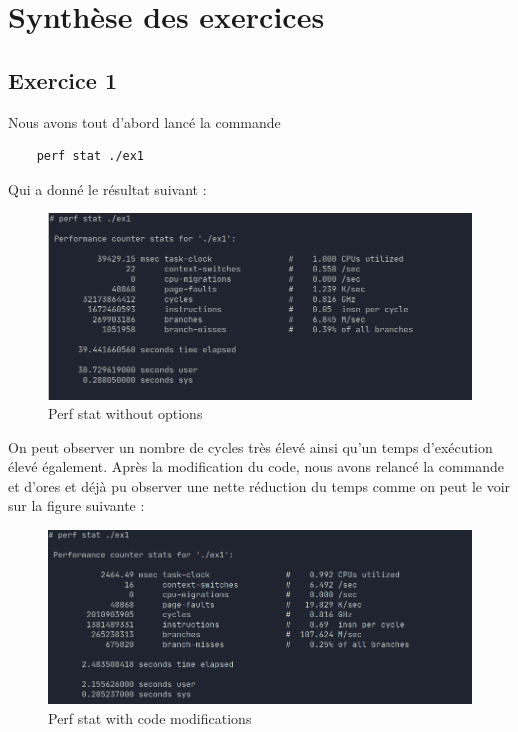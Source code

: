 \documentclass{ReportTemplate}
\begin{document}
\section{Synthèse des exercices}
\subsection{Exercice 1}
\label{Exercice1}
Nous avons tout d'abord lancé la commande 
\begin{verbatim}
    perf stat ./ex1
\end{verbatim}
Qui a donné le résultat suivant :
\begin{figure}[H]
    \centering
    \includegraphics[width=\textwidth]{imageSources/perf_stat_without_option.png}
    \caption{Perf stat without options}
    \label{fig:PerfStatWithoutOption}
\end{figure}
On peut observer un nombre de cycles très élevé ainsi qu'un temps d'exécution
élevé également.
Après la modification du code, nous avons relancé la commande et d'ores et déjà
pu observer une nette réduction du temps comme on peut le voir sur la figure
suivante :
\begin{figure}[H]
    \centering
    \includegraphics[width=\textwidth]{imageSources/perf_stat_with_codeModif.png}
    \caption{Perf stat with code modifications}
    \label{fig:PerfStatWithCodeModif}
\end{figure}
\end{document}
